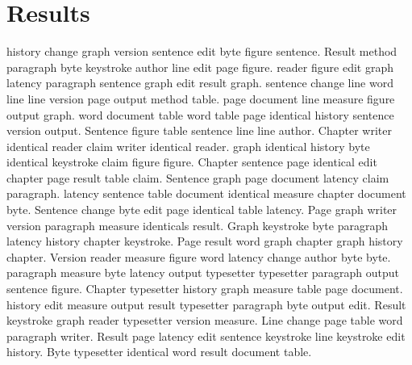 \documentclass{article}
\begin{document}
\section{Results}
history change graph version sentence edit byte figure sentence. Result method paragraph byte keystroke author line edit page figure. reader figure edit graph latency paragraph sentence graph edit result graph. sentence change line word line line version page output method table. page document line measure figure output graph. word document table word table page identical history sentence version output. Sentence figure table sentence line line author. Chapter writer identical reader claim writer identical reader. graph identical history byte identical keystroke claim figure figure. Chapter sentence page identical edit chapter page result table claim. Sentence graph page document latency claim paragraph. latency sentence table document identical measure chapter document byte. Sentence change byte edit page identical table latency. Page graph writer version paragraph measure identicals result. Graph keystroke byte paragraph latency history chapter keystroke. Page result word graph chapter graph history chapter. Version reader measure figure word latency change author byte byte. paragraph measure byte latency output typesetter typesetter paragraph output sentence figure. Chapter typesetter history graph measure table page document. history edit measure output result typesetter paragraph byte output edit. Result keystroke graph reader typesetter version measure. Line change page table word paragraph writer. Result page latency edit sentence keystroke line keystroke edit history. Byte typesetter identical word result document table.
\end{document}
